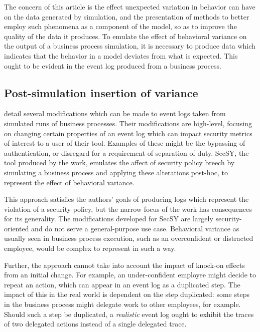 \documentclass[12pt]{llncs}  %
\begin{document}
The concern of this article is the effect unexpected variation in behavior can
have on the data generated by simulation, and the presentation of methods to
better employ such phenomena as a component of the model, so as to improve the
quality of the data it produces. To emulate the effect of behavioral variance on
the output of a business process simulation, it is necessary to produce data
which indicates that the behavior in a model deviates from what is expected.
This ought to be evident in the event log produced from a business process.
\par

\subsection{Post-simulation insertion of variance}
\cite{accorsi2013secsy} detail several modifications which can be made to event
logs taken from simulated runs of business processes. Their modifications are
high-level, focusing on changing certain properties of an event log which can
impact security metrics of interest to a user of their tool. Examples of these 
might be the bypassing of authentication, or disregard for a requirement of
separation of duty. SecSY, the tool produced by the work, emulates the affect of
security policy breech by simulating a business process and applying these
alterations post-hoc, to represent the effect of behavioral variance.
\par

This approach satisfies the authors' goals of producing logs which represent the
violation of a security policy, but the narrow focus of the work has
consequences for its generality. The modifications developed for SecSY are
largely security-oriented and do not serve a general-purpose use case.
Behavioral variance as usually seen in business process execution, such as an
overconfident or distracted employee, would be complex to represent in such a
way.
\par

Further, the approach cannot take into account the impact of knock-on
effects from an initial change. For example, an under-confident employee might
decide to repeat an action, which can appear in an event log as a duplicated
step. The impact of this in the real world is dependent on the step duplicated:
some steps in the business process might delegate work to other employees, for
example. Should such a step be duplicated, a \emph{realistic} event log ought to
exhibit the traces of two delegated actions instead of a single delegated trace.
\par
\end{document}
